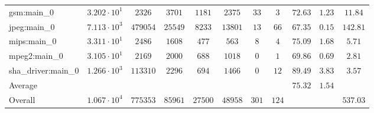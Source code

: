 \begin{tabular}{|l|c|c|c|c|c|c|c|c|c|c|}
gsm:main\_0             & $ 3.202 \cdot 10^{1} $ & $ 2326   $ & $ 3701  $ & $ 1181  $ & $ 2375  $ & $ 33  $ & $ 3   $ & $ 72.63       $ & $ 1.23    $ & $ 11.84   $ \\
jpeg:main\_0            & $ 7.113 \cdot 10^{3} $ & $ 479054 $ & $ 25549 $ & $ 8233  $ & $ 13801 $ & $ 13  $ & $ 66  $ & $ 67.35       $ & $ 0.15    $ & $ 142.81  $ \\
mips:main\_0            & $ 3.311 \cdot 10^{1} $ & $ 2486   $ & $ 1608  $ & $ 477   $ & $ 563   $ & $ 8   $ & $ 4   $ & $ 75.09       $ & $ 1.68    $ & $ 5.71    $ \\
mpeg2:main\_0           & $ 3.105 \cdot 10^{1} $ & $ 2169   $ & $ 2000  $ & $ 688   $ & $ 1018  $ & $ 0   $ & $ 1   $ & $ 69.86       $ & $ 0.69    $ & $ 2.81    $ \\
sha\_driver:main\_0     & $ 1.266 \cdot 10^{3} $ & $ 113310 $ & $ 2296  $ & $ 694   $ & $ 1466  $ & $ 0   $ & $ 12  $ & $ 89.49       $ & $ 3.83    $ & $ 3.57    $ \\
\hline
Average                 & $                    $ & $        $ & $       $ & $       $ & $       $ & $     $ & $     $ & $ 75.32       $ & $ 1.54    $ & $         $ \\
\hline
Overall                 & $ 1.067 \cdot 10^{4} $ & $ 775353 $ & $ 85961 $ & $ 27500 $ & $ 48958 $ & $ 301 $ & $ 124 $ & $             $ & $         $ & $ 537.03  $ \\
\hline
\end{tabular}
